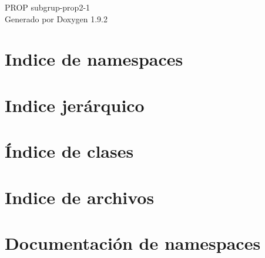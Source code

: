 \documentclass[twoside]{book}
\newcommand{\+}{\discretionary{\mbox{\scriptsize$\hookleftarrow$}}{}{}}
\newcommand{\clearemptydoublepage}{%
    \newpage{\pagestyle{empty}\cleardoublepage}%
  }
\begin{document}
  \raggedbottom
    \hypersetup{pageanchor=false,
                bookmarksnumbered=true,
                pdfencoding=unicode
               }
  \begin{titlepage}
  \vspace*{7cm}
  \begin{center}%
  {\Large PROP subgrup-\/prop2-\/1}\\
  \vspace*{1cm}
  {\large Generado por Doxygen 1.9.2}\\
  \end{center}
  \end{titlepage}
  \clearemptydoublepage
  \tableofcontents
  \clearemptydoublepage
  \hypersetup{pageanchor=true}
\chapter{Indice de namespaces}

\chapter{Indice jerárquico}

\chapter{Índice de clases}

\chapter{Indice de archivos}

\chapter{Documentación de namespaces}




\end{document}
